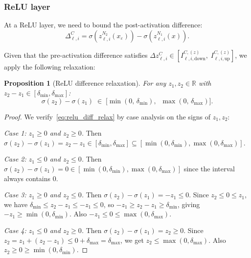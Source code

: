 \documentclass[11pt]{article}
\newcommand{\R}{\mathbb{R}}
\newcommand{\layerl}{\ell}
\newtheorem{proposition}{Proposition}
\begin{document}
\subsubsection{ReLU layer}

At a ReLU layer, we need to bound the post-activation difference:
\begin{equation}
    \Delta^C_{\layerl,i}
    = \sigma(z^{N_2}_{\layerl,i}(x_\varepsilon)) - \sigma(z^{N_1}_{\layerl,i}(x)).
\end{equation}

Given that the pre-activation difference satisfies
$\Delta z^C_{\layerl,i} \in [I^{C,(z)}_{\layerl,i,\text{down}},\; I^{C,(z)}_{\layerl,i,\text{up}}]$,
we apply the following relaxation:

\begin{proposition}[ReLU difference relaxation]
\label{prop:relu_relax}
For any $z_1, z_2 \in \R$ with $z_2 - z_1 \in [\delta_{\min}, \delta_{\max}]$:
\begin{equation}
    \sigma(z_2) - \sigma(z_1) \;\in\; \bigl[\min(0,\, \delta_{\min}),\;\; \max(0,\, \delta_{\max})\bigr].
    \label{eq:relu_diff_relax}
\end{equation}
\end{proposition}

\begin{proof}
We verify~\eqref{eq:relu_diff_relax} by case analysis on the signs of $z_1, z_2$:

\emph{Case 1: $z_1 \ge 0$ and $z_2 \ge 0$.}\;
Then $\sigma(z_2) - \sigma(z_1) = z_2 - z_1 \in [\delta_{\min}, \delta_{\max}]
\subseteq [\min(0,\delta_{\min}), \max(0,\delta_{\max})]$. \checkmark

\emph{Case 2: $z_1 \le 0$ and $z_2 \le 0$.}\;
Then $\sigma(z_2) - \sigma(z_1) = 0 \in [\min(0,\delta_{\min}), \max(0,\delta_{\max})]$
since the interval always contains $0$. \checkmark

\emph{Case 3: $z_1 \ge 0$ and $z_2 \le 0$.}\;
Then $\sigma(z_2) - \sigma(z_1) = -z_1 \le 0$.
Since $z_2 \le 0 \le z_1$, we have $\delta_{\min} \le z_2 - z_1 \le -z_1 \le 0$,
so $-z_1 \ge z_2 - z_1 \ge \delta_{\min}$, giving $-z_1 \ge \min(0, \delta_{\min})$.
Also $-z_1 \le 0 \le \max(0, \delta_{\max})$. \checkmark

\emph{Case 4: $z_1 \le 0$ and $z_2 \ge 0$.}\;
Then $\sigma(z_2) - \sigma(z_1) = z_2 \ge 0$.
Since $z_2 = z_1 + (z_2 - z_1) \le 0 + \delta_{\max} = \delta_{\max}$,
we get $z_2 \le \max(0, \delta_{\max})$.
Also $z_2 \ge 0 \ge \min(0, \delta_{\min})$. \checkmark
\end{proof}
\end{document}
